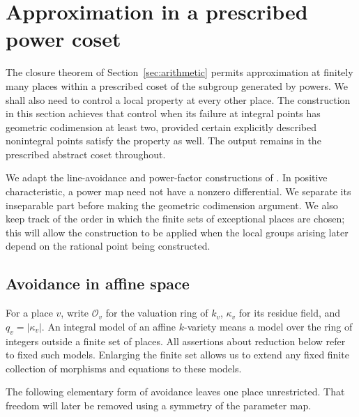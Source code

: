 \section{Approximation in a prescribed power coset}
\label{sec:approximation}

The closure theorem of Section~\ref{sec:arithmetic} permits approximation
at finitely many places within a prescribed coset of the subgroup generated
by powers.  We shall also need to control a local property at every other
place.  The construction in this section achieves that control when its
failure at integral points has geometric codimension at least two, provided
certain explicitly described nonintegral points satisfy the property as
well.  The output remains in the prescribed abstract coset throughout.

We adapt the line-avoidance and power-factor constructions of
\cite[Sections~2.3--2.4]{MPNF}.  In positive characteristic, a power map
need not have a nonzero differential.  We separate its inseparable part
before making the geometric codimension argument.  We also keep track of
the order in which the finite sets of exceptional places are chosen;
this will allow the construction to be applied when the local groups
arising later depend on the rational point being constructed.

\subsection{Avoidance in affine space}

For a place $v$, write $\mathcal O_v$ for the valuation ring of $k_v$,
$\kappa_v$ for its residue field, and $q_v=|\kappa_v|$.
An integral model of an affine $k$-variety means a model over the ring
of integers outside a finite set of places.  All assertions about
reduction below refer to fixed such models.  Enlarging the finite set
allows us to extend any fixed finite collection of morphisms and
equations to these models.

The following elementary form of avoidance leaves one place unrestricted.
That freedom will later be removed using a symmetry of the parameter map.

